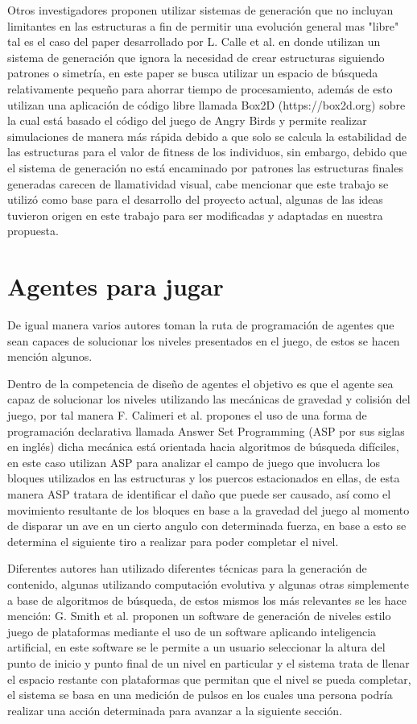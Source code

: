 Otros investigadores proponen utilizar sistemas de generación que no incluyan
limitantes en las estructuras a fin de permitir una evolución general mas
"libre" tal es el caso del paper desarrollado por L. Calle et al.
\cite{Calle2019} en donde utilizan un sistema de generación que ignora la
necesidad de crear estructuras siguiendo patrones o simetría, en este paper se
busca utilizar un espacio de búsqueda relativamente pequeño para ahorrar tiempo
de procesamiento, además de esto utilizan una aplicación de código libre llamada
Box2D (https://box2d.org) sobre la cual está basado el código del juego de Angry
Birds y permite realizar simulaciones de manera más rápida debido a que solo se
calcula la estabilidad de las estructuras para el valor de fitness de los
individuos, sin embargo, debido que el sistema de generación no está encaminado
por patrones las estructuras finales generadas carecen de llamatividad visual,
cabe mencionar que este trabajo se utilizó como base para el desarrollo del
proyecto actual, algunas de las ideas tuvieron origen en este trabajo para ser
modificadas y adaptadas en nuestra propuesta.

\section{Agentes para jugar}
\label{section:others}

De igual manera varios autores toman la ruta de programación de agentes que sean
capaces de solucionar los niveles presentados en el juego, de estos se hacen
mención algunos.

Dentro de la competencia de diseño de agentes el objetivo es que el agente sea
capaz de solucionar los niveles utilizando las mecánicas de gravedad y colisión
del juego, por tal manera F. Calimeri et al. \cite{Calimeri2016} propones el uso
de una forma de programación declarativa llamada Answer Set Programming (ASP por
sus siglas en inglés) dicha mecánica está orientada hacia algoritmos de búsqueda
difíciles, en este caso utilizan ASP para analizar el campo de juego que
involucra los bloques utilizados en las estructuras y los puercos estacionados
en ellas, de esta manera ASP tratara de identificar el daño que puede ser
causado, así como el movimiento resultante de los bloques en base a la gravedad
del juego al momento de disparar un ave en un cierto angulo con determinada
fuerza, en base a esto se determina el siguiente tiro a realizar para poder
completar el nivel. 

Diferentes autores han utilizado diferentes técnicas para la generación de
contenido, algunas utilizando computación evolutiva y algunas otras simplemente
a base de algoritmos de búsqueda, de estos mismos los más relevantes se les hace
mención: G. Smith et al.\cite{Smith2009} proponen un software de generación de
niveles estilo juego de plataformas mediante el uso de un software aplicando
inteligencia artificial, en este software se le permite a un usuario seleccionar
la altura del punto de inicio y punto final de un nivel en particular y el
sistema trata de llenar el espacio restante con plataformas que permitan que el
nivel se pueda completar, el sistema se basa en una medición de pulsos en los
cuales una persona podría realizar una acción determinada para avanzar a la
siguiente sección.
